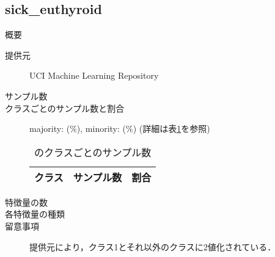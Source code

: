 \subsection{sick\_euthyroid}
\begin{description}
    \item[概要] \cite{}
    \item[提供元] UCI Machine Learning Repository
    \item[サンプル数] 
    \item[クラスごとのサンプル数と割合] majority:  (\%), minority:  (\%) (詳細は表\ref{tab:}を参照)

        \begin{table}[htbp]
            \centering
            \caption{のクラスごとのサンプル数}
            \label{tab:}
            \begin{tabular}{lrc} \hline
                \multicolumn{1}{c}{クラス}&
                \multicolumn{1}{c}{サンプル数}&
                \multicolumn{1}{c}{割合}\\
                \hline
                \hline

                \hline
            \end{tabular}
        \end{table}

    \item[特徴量の数] 
    \item[各特徴量の種類] \mbox{}
        
    \item[留意事項] 提供元により，クラス1とそれ以外のクラスに2値化されている．
\end{description}


